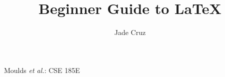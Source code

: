 \documentclass[12pt,journal,compsoc]{IEEEtran}
\begin{document}

\title{Beginner Guide to \LaTeX{}}
\author{Jade Cruz}

\date{}		%

\markboth{}%
{Moulds \MakeLowercase{\textit{et al.}}: CSE 185E}
% 

\end{document}

